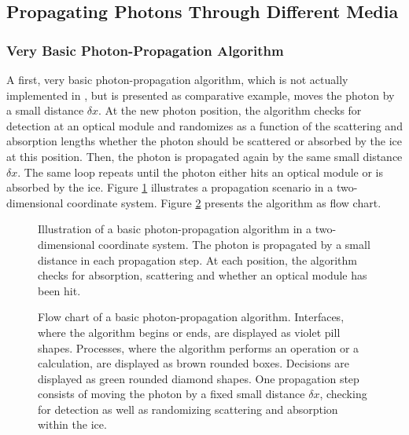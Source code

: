 
\subsection{Propagating Photons Through Different Media}

\subsubsection{Very Basic Photon-Propagation Algorithm}

A first, very basic photon-propagation algorithm, which is not actually implemented in \clsim, but is presented as comparative example, moves the photon by a small distance $\delta x$. At the new photon position, the algorithm checks for detection at an optical module and randomizes as a function of the scattering and absorption lengths whether the photon should be scattered or absorbed by the ice at this position. Then, the photon is propagated again by the same small distance $\delta x$. The same loop repeats until the photon either hits an optical module or is absorbed by the ice.
Figure \ref{fig:ieph6Bie} illustrates a propagation scenario in a two-dimensional coordinate system. Figure \ref{fig:ohsa0miG} presents the algorithm as flow chart.

\begin{figure}[htb]
  \caption{Illustration of a basic photon-propagation algorithm in a two-dimensional coordinate system. The photon is propagated by a small distance in each propagation step. At each position, the algorithm checks for absorption, scattering and whether an optical module has been hit.}
  \label{fig:ieph6Bie}
\end{figure}

\begin{figure}[p]
  \caption{Flow chart of a basic photon-propagation algorithm. Interfaces, where the algorithm begins or ends, are displayed as violet pill shapes. Processes, where the algorithm performs an operation or a calculation, are displayed as brown rounded boxes. Decisions are displayed as green rounded diamond shapes. One propagation step consists of moving the photon by a fixed small distance $\delta x$, checking for detection as well as randomizing scattering and absorption within the ice.}
  \label{fig:ohsa0miG}
\end{figure}

